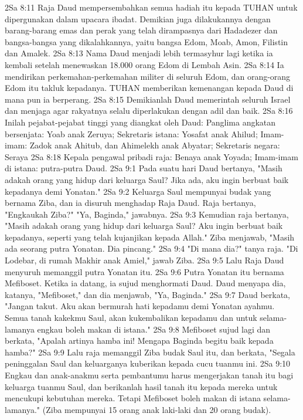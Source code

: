 2Sa 8:11  Raja Daud mempersembahkan semua hadiah itu kepada TUHAN untuk dipergunakan dalam upacara ibadat. Demikian juga dilakukannya dengan barang-barang emas dan perak yang telah dirampasnya dari Hadadezer dan bangsa-bangsa yang dikalahkannya, yaitu bangsa Edom, Moab, Amon, Filistin dan Amalek.
2Sa 8:13  Nama Daud menjadi lebih termasyhur lagi ketika ia kembali setelah menewaskan 18.000 orang Edom di Lembah Asin.
2Sa 8:14  Ia mendirikan perkemahan-perkemahan militer di seluruh Edom, dan orang-orang Edom itu takluk kepadanya. TUHAN memberikan kemenangan kepada Daud di mana pun ia berperang.
2Sa 8:15  Demikianlah Daud memerintah seluruh Israel dan menjaga agar rakyatnya selalu diperlakukan dengan adil dan baik.
2Sa 8:16  Inilah pejabat-pejabat tinggi yang diangkat oleh Daud: Panglima angkatan bersenjata: Yoab anak Zeruya; Sekretaris istana: Yosafat anak Ahilud; Imam-imam: Zadok anak Ahitub, dan Ahimelekh anak Abyatar; Sekretaris negara: Seraya
2Sa 8:18  Kepala pengawal pribadi raja: Benaya anak Yoyada; Imam-imam di istana: putra-putra Daud.
2Sa 9:1  Pada suatu hari Daud bertanya, "Masih adakah orang yang hidup dari keluarga Saul? Jika ada, aku ingin berbuat baik kepadanya demi Yonatan."
2Sa 9:2  Keluarga Saul mempunyai budak yang bernama Ziba, dan ia disuruh menghadap Raja Daud. Raja bertanya, "Engkaukah Ziba?" "Ya, Baginda," jawabnya.
2Sa 9:3  Kemudian raja bertanya, "Masih adakah orang yang hidup dari keluarga Saul? Aku ingin berbuat baik kepadanya, seperti yang telah kujanjikan kepada Allah." Ziba menjawab, "Masih ada seorang putra Yonatan. Dia pincang."
2Sa 9:4  "Di mana dia?" tanya raja. "Di Lodebar, di rumah Makhir anak Amiel," jawab Ziba.
2Sa 9:5  Lalu Raja Daud menyuruh memanggil putra Yonatan itu.
2Sa 9:6  Putra Yonatan itu bernama Mefiboset. Ketika ia datang, ia sujud menghormati Daud. Daud menyapa dia, katanya, "Mefiboset," dan dia menjawab, "Ya, Baginda."
2Sa 9:7  Daud berkata, "Jangan takut. Aku akan bermurah hati kepadamu demi Yonatan ayahmu. Semua tanah kakekmu Saul, akan kukembalikan kepadamu dan untuk selama-lamanya engkau boleh makan di istana."
2Sa 9:8  Mefiboset sujud lagi dan berkata, "Apalah artinya hamba ini! Mengapa Baginda begitu baik kepada hamba?"
2Sa 9:9  Lalu raja memanggil Ziba budak Saul itu, dan berkata, "Segala peninggalan Saul dan keluarganya kuberikan kepada cucu tuanmu ini.
2Sa 9:10  Engkau dan anak-anakmu serta pembantumu harus mengerjakan tanah itu bagi keluarga tuanmu Saul, dan berikanlah hasil tanah itu kepada mereka untuk mencukupi kebutuhan mereka. Tetapi Mefiboset boleh makan di istana selama-lamanya." (Ziba mempunyai 15 orang anak laki-laki dan 20 orang budak).
